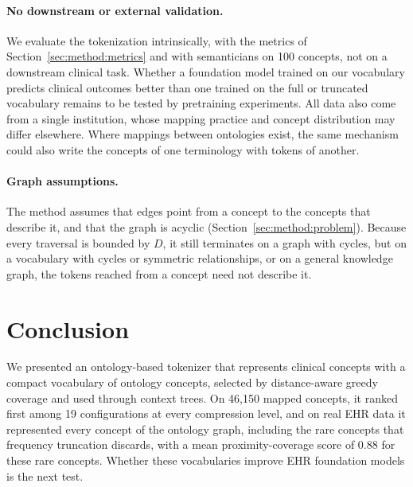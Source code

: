 \paragraph{No downstream or external validation.}
We evaluate the tokenization intrinsically, with the metrics of Section~\ref{sec:method:metrics} and with semanticians on 100 concepts, not on a downstream clinical task.
Whether a foundation model trained on our vocabulary predicts clinical outcomes better than one trained on the full or truncated vocabulary remains to be tested by pretraining experiments.
All data also come from a single institution, whose mapping practice and concept distribution may differ elsewhere.
Where mappings between ontologies exist, the same mechanism could also write the concepts of one terminology with tokens of another.

\paragraph{Graph assumptions.}
The method assumes that edges point from a concept to the concepts that describe it, and that the graph is acyclic (Section~\ref{sec:method:problem}).
Because every traversal is bounded by $D$, it still terminates on a graph with cycles, but on a vocabulary with cycles or symmetric relationships, or on a general knowledge graph, the tokens reached from a concept need not describe it.

\section{Conclusion}
\label{sec:conclusion}

We presented an ontology-based tokenizer that represents clinical concepts with a compact vocabulary of ontology concepts, selected by distance-aware greedy coverage and used through context trees.
On 46,150 mapped concepts, it ranked first among 19 configurations at every compression level, and on real EHR data it represented every concept of the ontology graph, including the rare concepts that frequency truncation discards, with a mean proximity-coverage score of 0.88 for these rare concepts.
Whether these vocabularies improve EHR foundation models is the next test.

